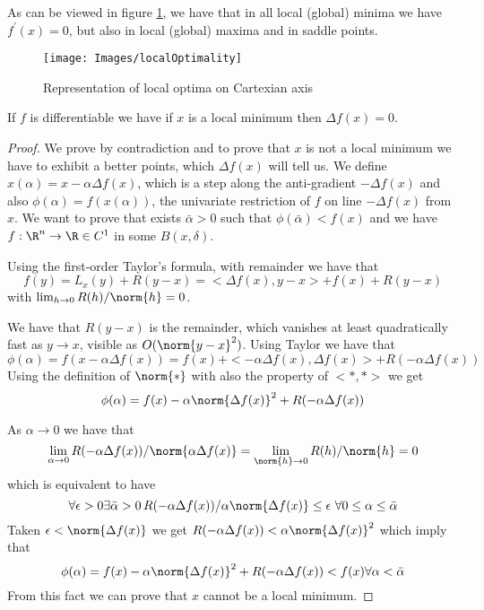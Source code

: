 As can be viewed in figure \ref{img:localOptimality}, we have that in all local (global) minima
we have $f^'(x) = 0$, but also in local (global) maxima and in saddle points.
\begin{figure}
    \texttt{[image: Images/localOptimality]}
    \caption{Representation of local optima on Cartexian axis}
    \label{img:localOptimality}
\end{figure}
\begin{thm}
    If $f$ is differentiable we have if $x$ is a local minimum then $\Delta f(x) = 0$.
\end{thm}
\begin{proof}
    We prove by contradiction and to prove that $x$ is not a local minimum we have to exhibit
    a better points, which $\Delta f(x)$ will tell us.\newline
    We define $x(\alpha) = x - \alpha \Delta f(x)$, which is a step along the anti-gradient 
    $-\Delta f(x)$ and also $\phi(\alpha) = f(x(\alpha))$, the univariate restriction of $f$ 
    on line $-\Delta f(x)$ from $x$.\newline
    We want to prove that exists $\bar{\alpha} > 0$ such that $\phi(\bar{\alpha}) < f(x)$ and 
    we have $f:\R^n \to \R \in C^1$ in some $B(x, \delta)$.

    Using the first-order Taylor's formula, with remainder we have that
    \[ f(y) = L_x(y) + R(y - x) = <\Delta f(x), y - x> + f(x) + R(y-x) \]
    with $\lim_{h \to 0} R(h)/\norm{h} = 0$.

    We have that $R(y - x)$ is the remainder, which vanishes at least quadratically fast as 
    $y \to x$, visible as $O(\norm{y - x}^2)$.\newline
    Using Taylor we have that
    \[ \phi(\alpha) = f(x - \alpha \Delta f(x)) = f(x) + <-\alpha \Delta f(x), \Delta f(x)>
                                                       + R(-\alpha \Delta f(x)) \]
    Using the definition of $\norm{*}$ with also the property of $<*, *>$ we get
    \[ \phi(\alpha) = f(x) - \alpha \norm{\Delta f(x)}^2 + R(-\alpha \Delta f(x)) \]

    As $\alpha \to 0$ we have that 
    \[ \lim_{\alpha \to 0}R(-\alpha \Delta f(x))/\norm{\alpha \Delta f(x)} = 
       \lim_{\norm{h} \to 0} R(h) / \norm{h} = 0 \]
    which is equivalent to have 
    \[ \forall \epsilon > 0 \exists \bar{\alpha} > 0 \, R(-\alpha \Delta f(x)) / 
            \alpha \norm{\Delta f(x)} \leq \epsilon \,\, \forall 0 \leq \alpha \leq \bar{\alpha} \]
    Taken $\epsilon < \norm{\Delta f(x)}$ we get $R(-\alpha \Delta f(x)) < 
    \alpha \norm{\Delta f(x)}^2$ which imply that 
    \[ \phi(\alpha) = f(x) - \alpha \norm{\Delta f(x)}^2 + R(-\alpha \Delta f(x)) < f(x) 
           \forall \alpha < \bar{\alpha} \]
    From this fact we can prove that $x$ cannot be a local minimum.
\end{proof}
